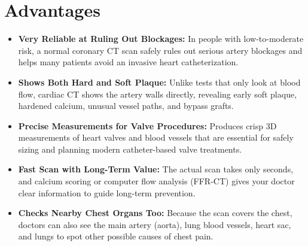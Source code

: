 \section{Advantages}
\begin{itemize}
    \item \textbf{Very Reliable at Ruling Out Blockages:} In people with low-to-moderate risk, a normal coronary CT scan safely rules out serious artery blockages and helps many patients avoid an invasive heart catheterization.
    \item \textbf{Shows Both Hard and Soft Plaque:} Unlike tests that only look at blood flow, cardiac CT shows the artery walls directly, revealing early soft plaque, hardened calcium, unusual vessel paths, and bypass grafts.
    \item \textbf{Precise Measurements for Valve Procedures:} Produces crisp 3D measurements of heart valves and blood vessels that are essential for safely sizing and planning modern catheter-based valve treatments.
    \item \textbf{Fast Scan with Long-Term Value:} The actual scan takes only seconds, and calcium scoring or computer flow analysis (FFR-CT) gives your doctor clear information to guide long-term prevention.
    \item \textbf{Checks Nearby Chest Organs Too:} Because the scan covers the chest, doctors can also see the main artery (aorta), lung blood vessels, heart sac, and lungs to spot other possible causes of chest pain.
\end{itemize}

